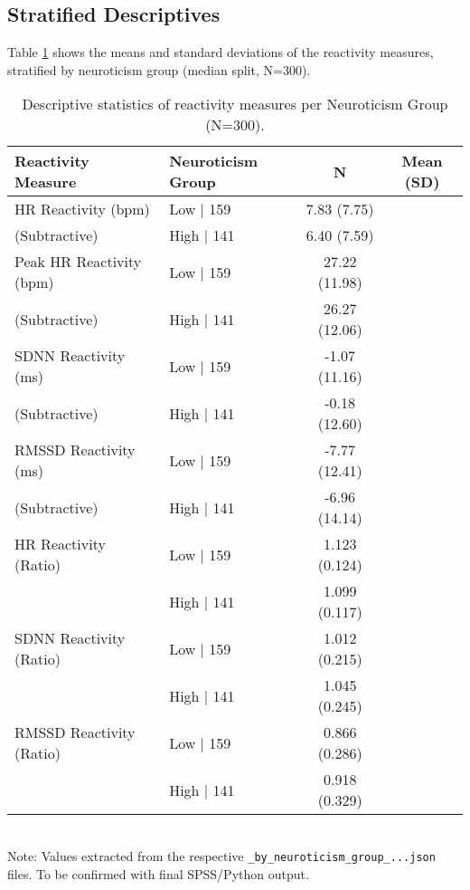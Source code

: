 \documentclass[11pt, a4paper]{report}
\begin{document}
\subsection{Stratified Descriptives}
\label{subsec:results_stratified_sample} %
Table \ref{tab:reactivity_per_neuroticism_results} shows the means and standard deviations of the reactivity measures, stratified by neuroticism group (median split, N=300).

\begin{table}[H]
\centering
\caption{Descriptive statistics of reactivity measures per Neuroticism Group (N=300).}
\label{tab:reactivity_per_neuroticism_results}
\begin{tabular}{@{}l l c c@{}}
\toprule
Reactivity Measure            & Neuroticism Group & N   & Mean (SD)      \\
\midrule
HR Reactivity (bpm)         & Low               | 159 & 7.83 (7.75)     \\
(Subtractive)                 & High              | 141 & 6.40 (7.59)     \\
Peak HR Reactivity (bpm)    & Low               | 159 & 27.22 (11.98)   \\
(Subtractive)                 & High              | 141 & 26.27 (12.06)   \\
SDNN Reactivity (ms)        & Low               | 159 & -1.07 (11.16)   \\
(Subtractive)                 & High              | 141 & -0.18 (12.60)   \\
RMSSD Reactivity (ms)       & Low               | 159 & -7.77 (12.41)   \\
(Subtractive)                 & High              | 141 & -6.96 (14.14)   \\
HR Reactivity (Ratio)       & Low               | 159 & 1.123 (0.124)   \\
                              & High              | 141 & 1.099 (0.117)   \\
SDNN Reactivity (Ratio)     & Low               | 159 & 1.012 (0.215)   \\
                              & High              | 141 & 1.045 (0.245)   \\
RMSSD Reactivity (Ratio)    & Low               | 159 & 0.866 (0.286)   \\
                              & High              | 141 & 0.918 (0.329)   \\
\bottomrule
\end{tabular}
\\ \footnotesize{Note: Values extracted from the respective \texttt{\_by\_neuroticism\_group\_...json} files. To be confirmed with final SPSS/Python output.}
\end{table}
\end{document}
